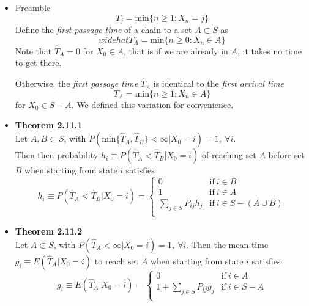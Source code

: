 \documentclass[11pt,a4paper]{article}
\begin{document}
\begin{itemize}

    \item Preamble \\
        \[
            T_j = \text{min}\{n \geq 1 : X_n = j\}
        \]
        Define the \emph{first passage time} of a chain to a set $A \subset S$ as
        \[
            widehat{T}_A = \text{min} \{n \geq 0 : X_n \in A \}
        \]
        Note that $\widehat{T}_A = 0$ for $X_0 \in A$,
        that is if we are already in $A$, it takes no time to get there.

        Otherwise, the \emph{first passage time} $\widehat{T}_A$ is identical to the
        \emph{first arrival time}
        \[
            T_A = \text{min} \{n \geq 1 : X_n \in A\}
        \]
        for $X_0 \in S - A$.
        We defined this variation for convenience.

    \item \textbf{Theorem 2.11.1} \\
        Let $A, B \subset S$, with
        $P(\text{min}\{\widehat{T}_A,\widehat{T}_B\} < \infty | X_0 = i) = 1, \ \forall i$. \\
        Then then probability
        $h_i \equiv P(\widehat{T}_A < \widehat{T}_B | X_0 = i)$
        of reaching set $A$ before set $B$ when starting from state $i$ satisfies
        \[
            h_i \equiv P(\widehat{T}_A < \widehat{T}_B | X_0 = i) =
            \begin{cases}{}
                0 & \text{if} \ i \in B \\
                1 & \text{if} \ i \in A \\
                \sum_{j \in S} P_{ij}h_j & \text{if} \ i \in S - (A \cup B) \\
            \end{cases}
        \]

    \item \textbf{Theorem 2.11.2} \\
        Let $A \subset S$, with $P(\widehat{T}_A < \infty | X_0 = i) = 1, \ \forall i$.
        Then the mean time $g_i \equiv E(\widehat{T}_A | X_0 = i)$
        to reach set $A$ when starting from state $i$ satisfies
        \[
            g_i \equiv E(\widehat{T}_A | X_0 = i) =
            \begin{cases}{}
                0 & \text{if} \ i \in A \\
                1 + \sum_{j \in S} P_{ij}g_j & \text{if} \ i \in S - A \\
            \end{cases}
        \]

\end{itemize}
\end{document}

